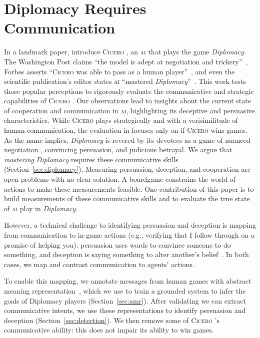 \documentclass[oneside]{memoir}
\newcommand{\cicero}{\abr{Cicero} }
\newcommand{\abr}[1]{\textsc{#1}}
\begin{document}
\section{Diplomacy Requires Communication}


In a landmark paper, \citet{meta2022human} introduce \cicero{}, an \abr{ai}
that plays the game \textit{Diplomacy}.
%
The Washington Post claims ``the model is adept at negotiation and
trickery''~\cite{washpost}, Forbes asserts ``\cicero{} was able to pass
as a human player''~\citep{forbes}, and even the scientific publication's editor
states \abr{ai} ``mastered
\textit{Diplomacy}''~\citep{meta2022human}.
%
This work tests those popular perceptions to 
rigorously evaluate the communicative and strategic capabilities of
\cicero{}.
%
Our observations lead to insights about the current state of
cooperation and communication in \abr{ai}, highlighting its deceptive
and persuasive characteristics.
%
While \cicero{} plays strategically and with a verisimilitude of human
communication, the evaluation in \citet{meta2022human} focuses only on
if \cicero{} wins games.
%
As the name implies, \textit{Diplomacy} is revered by its devotees as
a game of nuanced negotiation \citep{kraus1995designing}, convincing
persuasion, and judicious betrayal.
%
We argue that \emph{mastering} \textit{Diplomacy} requires these
communicative skills (Section~\ref{sec:diplomacy}).
%
Measuring persuasion, deception, and cooperation are open problems
with no clear solution.  A boardgame constrains the world of actions
to make these measurements feasible.
%
One contribution of this paper is to build measurements of these
communicative skills and to evaluate the true state of \abr{ai} play
in \textit{Diplomacy}.
%

However, a technical challenge to identifying persuasion and deception is
mapping from communication to in-game actions (e.g., verifying that I follow through on a promise of helping you):
%
persuasion uses words to convince someone to do something,
and deception is saying something to alter another's belief~\cite{chrisholm1977intent}.
%
In both cases, we map and contrast communication to agents' actions.


To enable this mapping, we annotate messages from human games with
abstract meaning
representation~\citep[\abr{amr},][]{banarescu-etal-2013-abstract},
which we use to train a grounded system to infer the goals of
Diplomacy players (Section~\ref{sec:amr}).
%
After validating we can extract communicative intents, we use these
representations to identify persuasion and deception
(Section~\ref{sec:detection}).
%
We then remove some of \cicero{}'s communicative ability: 
this does not impair its ability to win games.
\end{document}
